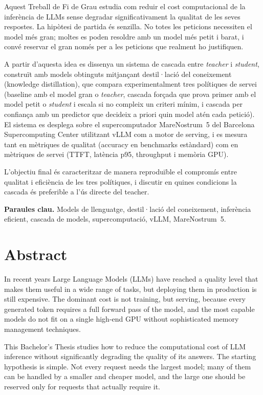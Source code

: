 Aquest Treball de Fi de Grau estudia com reduir el cost computacional de la inferència de LLMs sense degradar significativament la qualitat de les seves respostes. La hipòtesi de partida és senzilla. No totes les peticions necessiten el model més gran; moltes es poden resoldre amb un model més petit i barat, i convé reservar el gran només per a les peticions que realment ho justifiquen.

A partir d'aquesta idea es dissenya un sistema de cascada entre \textit{teacher} i \textit{student}, construït amb models obtinguts mitjançant destil·lació del coneixement (knowledge distillation), que compara experimentalment tres polítiques de servei (baseline amb el model gran o \textit{teacher}, cascada forçada que prova primer amb el model petit o \textit{student} i escala si no compleix un criteri mínim, i cascada per confiança amb un predictor que decideix a priori quin model atén cada petició). El sistema es desplega sobre el supercomputador MareNostrum~5 del Barcelona Supercomputing Center utilitzant vLLM com a motor de serving, i es mesura tant en mètriques de qualitat (accuracy en benchmarks estàndard) com en mètriques de servei (TTFT, latència p95, throughput i memòria GPU).

L'objectiu final és caracteritzar de manera reproduïble el compromís entre qualitat i eficiència de les tres polítiques, i discutir en quines condicions la cascada és preferible a l'ús directe del teacher.

\textbf{Paraules clau.} Models de llenguatge, destil·lació del coneixement, inferència eficient, cascada de models, supercomputació, vLLM, MareNostrum~5.

\newpage
\section*{Abstract}

In recent years Large Language Models (LLMs) have reached a quality level that makes them useful in a wide range of tasks, but deploying them in production is still expensive. The dominant cost is not training, but serving, because every generated token requires a full forward pass of the model, and the most capable models do not fit on a single high-end GPU without sophisticated memory management techniques.

This Bachelor's Thesis studies how to reduce the computational cost of LLM inference without significantly degrading the quality of its answers. The starting hypothesis is simple. Not every request needs the largest model; many of them can be handled by a smaller and cheaper model, and the large one should be reserved only for requests that actually require it.

